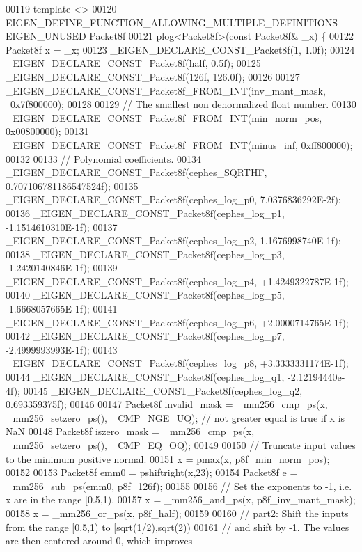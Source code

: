 \begin{DoxyCode}
00119 \textcolor{keyword}{template} <>
00120 EIGEN\_DEFINE\_FUNCTION\_ALLOWING\_MULTIPLE\_DEFINITIONS EIGEN\_UNUSED Packet8f
00121 plog<Packet8f>(\textcolor{keyword}{const} Packet8f& \_x) \{
00122   Packet8f x = \_x;
00123   \_EIGEN\_DECLARE\_CONST\_Packet8f(1, 1.0f);
00124   \_EIGEN\_DECLARE\_CONST\_Packet8f(half, 0.5f);
00125   \_EIGEN\_DECLARE\_CONST\_Packet8f(126f, 126.0f);
00126 
00127   \_EIGEN\_DECLARE\_CONST\_Packet8f\_FROM\_INT(inv\_mant\_mask, ~0x7f800000);
00128 
00129   \textcolor{comment}{// The smallest non denormalized float number.}
00130   \_EIGEN\_DECLARE\_CONST\_Packet8f\_FROM\_INT(min\_norm\_pos, 0x00800000);
00131   \_EIGEN\_DECLARE\_CONST\_Packet8f\_FROM\_INT(minus\_inf, 0xff800000);
00132 
00133   \textcolor{comment}{// Polynomial coefficients.}
00134   \_EIGEN\_DECLARE\_CONST\_Packet8f(cephes\_SQRTHF, 0.707106781186547524f);
00135   \_EIGEN\_DECLARE\_CONST\_Packet8f(cephes\_log\_p0, 7.0376836292E-2f);
00136   \_EIGEN\_DECLARE\_CONST\_Packet8f(cephes\_log\_p1, -1.1514610310E-1f);
00137   \_EIGEN\_DECLARE\_CONST\_Packet8f(cephes\_log\_p2, 1.1676998740E-1f);
00138   \_EIGEN\_DECLARE\_CONST\_Packet8f(cephes\_log\_p3, -1.2420140846E-1f);
00139   \_EIGEN\_DECLARE\_CONST\_Packet8f(cephes\_log\_p4, +1.4249322787E-1f);
00140   \_EIGEN\_DECLARE\_CONST\_Packet8f(cephes\_log\_p5, -1.6668057665E-1f);
00141   \_EIGEN\_DECLARE\_CONST\_Packet8f(cephes\_log\_p6, +2.0000714765E-1f);
00142   \_EIGEN\_DECLARE\_CONST\_Packet8f(cephes\_log\_p7, -2.4999993993E-1f);
00143   \_EIGEN\_DECLARE\_CONST\_Packet8f(cephes\_log\_p8, +3.3333331174E-1f);
00144   \_EIGEN\_DECLARE\_CONST\_Packet8f(cephes\_log\_q1, -2.12194440e-4f);
00145   \_EIGEN\_DECLARE\_CONST\_Packet8f(cephes\_log\_q2, 0.693359375f);
00146 
00147   Packet8f invalid\_mask = \_mm256\_cmp\_ps(x, \_mm256\_setzero\_ps(), \_CMP\_NGE\_UQ); \textcolor{comment}{// not greater equal is true
       if x is NaN}
00148   Packet8f iszero\_mask = \_mm256\_cmp\_ps(x, \_mm256\_setzero\_ps(), \_CMP\_EQ\_OQ);
00149 
00150   \textcolor{comment}{// Truncate input values to the minimum positive normal.}
00151   x = pmax(x, p8f\_min\_norm\_pos);
00152 
00153   Packet8f emm0 = pshiftright(x,23);
00154   Packet8f e = \_mm256\_sub\_ps(emm0, p8f\_126f);
00155 
00156   \textcolor{comment}{// Set the exponents to -1, i.e. x are in the range [0.5,1).}
00157   x = \_mm256\_and\_ps(x, p8f\_inv\_mant\_mask);
00158   x = \_mm256\_or\_ps(x, p8f\_half);
00159 
00160   \textcolor{comment}{// part2: Shift the inputs from the range [0.5,1) to [sqrt(1/2),sqrt(2))}
00161   \textcolor{comment}{// and shift by -1. The values are then centered around 0, which improves}

\end{DoxyCode}
